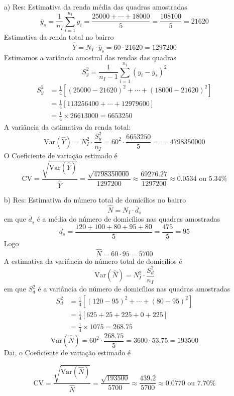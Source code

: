 \documentclass[a4paper,12pt,oneside,twocolumn]{Config/milktest}
\begin{document}
{\tiny 
\begin{itemize}
    \item[a) Res:] Estimativa da renda média das quadras amostradas \[
\overline{y}_s = \frac{1}{n_I} \sum_{i=1}^{n_I} y_i = \frac{25000 + \cdots + 18000}{5} = \frac{108100}{5} = 21620
\]
Estimativa da renda total no bairro
\[
\widehat{Y} = N_I \cdot \overline{y}_s = 60 \cdot 21620 = 1297200
\]
Estimamos a variância amostral das rendas das quadras
\[
S^2_{y} = \frac{1}{n_I - 1} \sum_{i=1}^{n_I} (y_i - \overline{y}_s)^2
\]
\[
\begin{aligned}
S^2_{y} &= \frac{1}{4} \left[(25000 - 21620)^2 + \cdots + (18000 - 21620)^2\right] \\
&= \frac{1}{4} \left[ 113256400 + \cdots + 12979600 \right] \\
&= \frac{1}{4} \times 26613000 = 6653250
\end{aligned}
\]
A variância da estimativa da renda total:
\[
\text{Var}(\widehat{Y}) = N_I^2 \cdot \frac{S^2_{y}}{n_I} = 60^2 \cdot \frac{6653250}{5} = = 4798350000
\]
O Coeficiente de variação estimado é
\[
\text{CV} = \frac{\sqrt{\text{Var}(\widehat{Y})}}{\widehat{Y}} = \frac{\sqrt{4798350000}}{1297200} \approx \frac{69276.27}{1297200} \approx 0.0534 \text{ ou } 5.34\%
\]

\item[b) Res:]  Estimativa do número total de domicílios no bairro
\[
\widehat{N} = N_I \cdot \overline{d}_s
\]
em que \(\overline{d}_s\) é a média do número de domicílios nas quadras amostradas
\[
\overline{d}_s = \frac{120 + 100 + 80 + 95 + 80}{5} = \frac{475}{5} = 95
\] Logo
\[
\widehat{N} = 60 \cdot 95 = 5700
\] A estimativa da variância do número total de domicílios é
\[
\text{Var}(\widehat{N}) = N_I^2 \cdot \frac{S^2_{d}}{n_I}
\]
em que \(S^2_{d}\) é a variância do número de domicílios nas quadras amostradas
\[
\begin{aligned}
S^2_{d} &= \frac{1}{4} \left[(120 - 95)^2 + \cdots + (80 - 95)^2\right] \\
&= \frac{1}{4} \left[ 625 + 25 + 225 + 0 + 225 \right] \\
&= \frac{1}{4} \times 1075 = 268.75
\end{aligned}
\]
\[
\text{Var}(\widehat{N}) = 60^2 \cdot \frac{268.75}{5} = 3600 \cdot 53.75 = 193500
\]
Dai, o Coeficiente de variação estimado é

\[
\text{CV} = \frac{\sqrt{\text{Var}(\widehat{N})}}{\widehat{N}} = \frac{\sqrt{193500}}{5700} \approx \frac{439.2}{5700} \approx 0.0770 \text{ ou } 7.70\%
\]


\end{itemize}}
\end{document}

